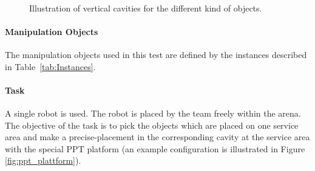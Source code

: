 \begin{figure} [h!]
\begin{center}
 \\
\end{center}
\caption{Illustration of vertical cavities for the different kind of objects.}
\label{fig:ppt_horizontal_tiles}
\end{figure}

\paragraph{Manipulation Objects}
The manipulation objects used in this test are defined by the instances described in Table~\ref{tab:Instances}.

\paragraph{Task}
A single robot is used. The robot is placed by the team freely within the arena. The objective of the task is to pick the objects which are placed on one service area and make a precise-placement in the corresponding cavity at the service area with the special PPT platform (an example configuration is illustrated in Figure \ref{fig:ppt_plattform}). 

